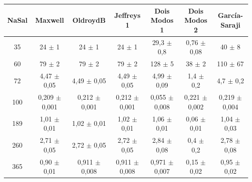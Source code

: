 		\begin{table}[h]
			{%
				\begin{tabular}{c | c c c c c c}
					\toprule
					NaSal & Maxwell               & OldroydB               & Jeffreys 1              & Dois Modos 1              & Dois Modos 2              & García-Saraji       \\ \midrule
					 35   & 24      \(\pm\) 1     & 24       \(\pm\) 1     & 24        \(\pm\) 1     & 29,3        \(\pm\) 0,8   & 0,76        \(\pm\) 0,08  & 40    \(\pm\) 8     \\
					 60   & 79      \(\pm\) 2     & 79       \(\pm\) 2     & 79        \(\pm\) 2     & 128         \(\pm\) 5     & 38          \(\pm\) 2     & 110   \(\pm\) 67    \\
					 72   & 4,47    \(\pm\) 0,05  & 4,49     \(\pm\) 0,05  & 4,49      \(\pm\) 0,05  & 4,99        \(\pm\) 0,09  & 1,4         \(\pm\) 0,2   & 4,7   \(\pm\) 0,2   \\
					 100  & 0,209   \(\pm\) 0,001 & 0,212    \(\pm\) 0,001 & 0,212     \(\pm\) 0,001 & 0,055       \(\pm\) 0,008 & 0,221       \(\pm\) 0,002 & 0,219 \(\pm\) 0,004 \\
					 189  & 1,01    \(\pm\) 0,01  & 1,02     \(\pm\) 0,01  & 1,02      \(\pm\) 0,01  & 1,06        \(\pm\) 0,01  & 0,06        \(\pm\) 0,01  & 1,04  \(\pm\) 0,03  \\
					 260  & 2,71    \(\pm\) 0,05  & 2,72     \(\pm\) 0,05  & 2,72      \(\pm\) 0,05  & 2,84        \(\pm\) 0,08  & 0,4         \(\pm\) 0,2   & 2,78  \(\pm\) 0,08  \\
					 365  & 0,90    \(\pm\) 0,01  & 0,911    \(\pm\) 0,008 & 0,911     \(\pm\) 0,008 & 0,971       \(\pm\) 0,007 & 0,15        \(\pm\) 0,02  & 0,95  \(\pm\) 0,02  \\ \bottomrule
				\end{tabular}
			}{}
		\end{table}  

